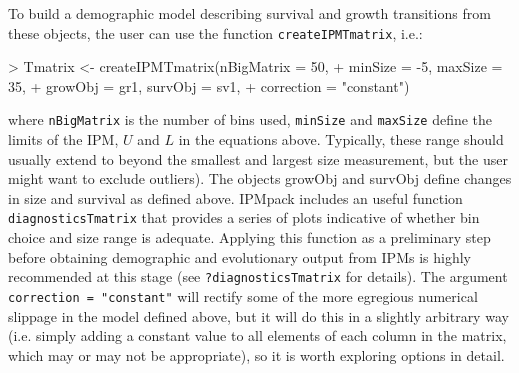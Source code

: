 \documentclass{article}
\begin{document}
To build a demographic model describing survival and growth transitions from these objects, the user can use the function {\tt createIPMTmatrix}, i.e.: 
\begin{Schunk}
\begin{Sinput}
> Tmatrix <- createIPMTmatrix(nBigMatrix = 50, 
+                             minSize = -5, maxSize = 35, 
+                             growObj = gr1, survObj = sv1, 
+                             correction = "constant")
\end{Sinput}
\end{Schunk}
where {\tt nBigMatrix} is the number of bins used, {\tt minSize} and
{\tt maxSize} define the limits of the IPM, $U$ and $L$ in the
equations above. Typically, these range
should usually extend to beyond the smallest and largest size
measurement, but the user might want to exclude outliers). The objects
growObj and survObj define changes in size and survival as defined
above. IPMpack includes an useful function {\tt diagnosticsTmatrix}
that provides a series of plots indicative of whether bin choice and
size range is adequate. Applying this function as a preliminary step
before obtaining demographic and evolutionary output from IPMs is
highly recommended at this stage (see {\tt ?diagnosticsTmatrix} for
details). The argument {\tt correction = "constant"} will rectify some
of the more egregious numerical slippage in the model defined above,
but it will do this in a slightly arbitrary way (i.e. simply adding a
constant value to all elements of each column in the matrix, which may
or may not be appropriate), so it is worth exploring options in detail.
\end{document}
